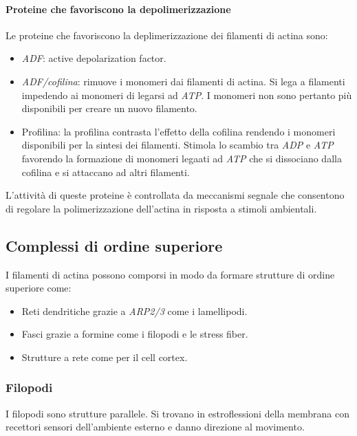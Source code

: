 			\paragraph{Proteine che favoriscono la depolimerizzazione}
			Le proteine che favoriscono la deplimerizzazione dei filamenti di actina sono:
			\begin{multicols}{2}
				\begin{itemize}
					\item \emph{ADF}: active depolarization factor.
					\item \emph{ADF/cofilina}: rimuove i monomeri dai filamenti di actina.
						Si lega a filamenti impedendo ai monomeri di legarsi ad \emph{ATP}.
						I monomeri non sono pertanto pi\`u disponibili per creare un nuovo filamento.
					\item Profilina: la profilina contrasta l'effetto della cofilina rendendo i monomeri disponibili per la sintesi dei filamenti.
						Stimola lo scambio tra \emph{ADP} e \emph{ATP} favorendo la formazione di monomeri legaati ad \emph{ATP} che si dissociano dalla cofilina e si attaccano ad altri filamenti.
				\end{itemize}
			\end{multicols}
			L'attivit\`a di queste proteine \`e controllata da meccanismi segnale che consentono di regolare la polimerizzazione dell'actina in risposta a stimoli ambientali.
		
	\subsection{Complessi di ordine superiore}
	I filamenti di actina possono comporsi in modo da formare strutture di ordine superiore come:
	\begin{multicols}{2}
		\begin{itemize}
			\item Reti dendritiche grazie a \emph{ARP2/3} come i lamellipodi.
			\item Fasci grazie a formine come i filopodi e le stress fiber.
			\item Strutture a rete come per il cell cortex.
		\end{itemize}
	\end{multicols}

		\subsubsection{Filopodi}
		I filopodi sono strutture parallele.
		Si trovano in estroflessioni della membrana con recettori sensori dell'ambiente esterno e danno direzione al movimento.

